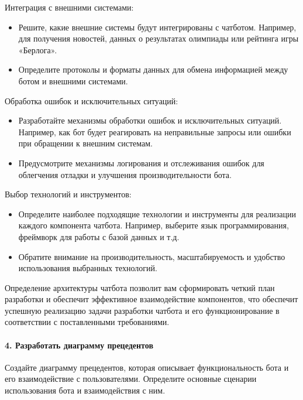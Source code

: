 \documentclass[letterpaper,10pt,russian]{sphinxmanual}
\begin{document}
 Интеграция с внешними системами:
\begin{itemize}
\item {} 
\sphinxAtStartPar
Решите, какие внешние системы будут интегрированы с чат\sphinxhyphen{}ботом. Например, для получения новостей, данных о результатах олимпиады или рейтинга игры «Берлога».

\item {} 
\sphinxAtStartPar
Определите протоколы и форматы данных для обмена информацией между ботом и внешними системами.

\end{itemize}

 Обработка ошибок и исключительных ситуаций:
\begin{itemize}
\item {} 
\sphinxAtStartPar
Разработайте механизмы обработки ошибок и исключительных ситуаций. Например, как бот будет реагировать на неправильные запросы или ошибки при обращении к внешним системам.

\item {} 
\sphinxAtStartPar
Предусмотрите механизмы логирования и отслеживания ошибок для облегчения отладки и улучшения производительности бота.

\end{itemize}

 Выбор технологий и инструментов:
\begin{itemize}
\item {} 
\sphinxAtStartPar
Определите наиболее подходящие технологии и инструменты для реализации каждого компонента чат\sphinxhyphen{}бота. Например, выберите язык программирования, фреймворк для работы с базой данных и т.д.

\item {} 
\sphinxAtStartPar
Обратите внимание на производительность, масштабируемость и удобство использования выбранных технологий.

\end{itemize}

\sphinxAtStartPar
Определение архитектуры чат\sphinxhyphen{}бота позволит вам сформировать четкий план разработки и обеспечит эффективное взаимодействие компонентов, что обеспечит успешную реализацию задачи разработки чат\sphinxhyphen{}бота и его функционирование в соответствии с поставленными требованиями.


\paragraph{4. Разработать диаграмму прецедентов}
\label{\detokenize{educational_materials/uml/content:id13}}
\sphinxAtStartPar
Создайте диаграмму прецедентов, которая описывает функциональность бота и его взаимодействие с пользователями. Определите основные сценарии использования бота и взаимодействия с ним.
\end{document}
